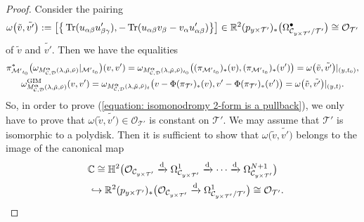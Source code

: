 \documentclass[pdftex]{sigma}
\numberwithin{equation}{section}
\newcommand{\Tr}{\mathop{\rm Tr}\nolimits}
\newcommand{\balpha}{\boldsymbol \alpha}
\begin{document}
\begin{proof}
Consider the pairing
\[
 \omega \big(\tilde{v},\tilde{v'} \big)
 :=
 \big[ \big\{ \Tr(u_{\alpha\beta} u'_{\beta\gamma}) ,
 -\Tr(u_{\alpha\beta}v_{\beta}-v_{\alpha}u'_{\alpha\beta}) \big\} \big]
 \in \mathbb{R}^2(p_{y\times{\mathcal T'}})_*
 \big( \Omega^{\bullet}_{{\mathcal C}_{y\times{\mathcal T'}}/{\mathcal T'}} \big)
 \cong{\mathcal O}_{\mathcal T'}
\]
of $\tilde{v}$ and $\tilde{v'}$.
Then we have the equalities
\begin{gather*}
 \pi_{{\mathcal M'}_{t_0}}^* \big(
 \omega_{M^{\balpha}_{{\mathcal C},{\mathcal D}}(\lambda,\tilde{\mu},\tilde{\nu})}
 |_{{\mathcal M'}_{t_0}} \big) (v,v')
 =
 \omega_{M^{\balpha}_{{\mathcal C},{\mathcal D}}(\lambda,\tilde{\mu},\tilde{\nu})_{t_0}}
 \big( (\pi_{{\mathcal M'}_{t_0}})_*(v) , (\pi_{{\mathcal M'}_{t_0}})_*(v') \big)
 =
 \omega \big(\tilde{v},\tilde{v'} \big)|_{(y,t_0)} ,
 \\
 \omega^{\rm GIM}_{M^{\balpha}_{{\mathcal C},{\mathcal D}}(\lambda,\tilde{\mu},\tilde{\nu})}
 (v,v')
 =
 \omega_{M^{\balpha}_{{\mathcal C},{\mathcal D}}(\lambda,\tilde{\mu},\tilde{\nu})_{t}}
 \big( v-\Phi(\pi_{\mathcal T'})_*(v) , v'-\Phi(\pi_{\mathcal T'})_*(v') \big)
 =
 \omega \big(\tilde{v},\tilde{v'} \big)|_{(y,t)}.
\end{gather*}
So, in order to prove (\ref{equation: isomonodromy 2-form is a pullback}),
we only have to prove that
$\omega \big(\tilde{v},\tilde{v'} \big)
 \in {\mathcal O}_{\mathcal T'}$
is constant on ${\mathcal T'}$.
We may assume that ${\mathcal T}'$ is isomorphic to a polydisk.
Then it is sufficient to show that
$\omega \big(\tilde{v},\tilde{v'} \big)$
belongs to the image of the canonical map
\begin{gather}
 \mathbb{C}\cong
 \mathbb{H}^2\big({\mathcal O}_{{\mathcal C}_{y\times{\mathcal T}'}}
\xrightarrow{{\rm d}} \Omega^1_{{\mathcal C}_{y\times{\mathcal T}'}}
\xrightarrow{{\rm d}}\cdots\xrightarrow{{\rm d}} \Omega^{N+1}_{{\mathcal C}_{y\times{\mathcal T}'}} \big)\nonumber\\
\hphantom{\mathbb{C}}{}
 \hookrightarrow
\mathbb{R}^2(p_{y\times{\mathcal T'}})_*\big( {\mathcal O}_{{\mathcal C}_{y\times{\mathcal T}'}}
\xrightarrow{{\rm d}} \Omega^1_{{\mathcal C}_{y\times{\mathcal T}'}/{\mathcal T'}} \big)
\cong{\mathcal O}_{\mathcal T'}. \label{equation: map from de Rham cohomology of total differentials}
\end{gather}


\end{proof}
\end{document}
